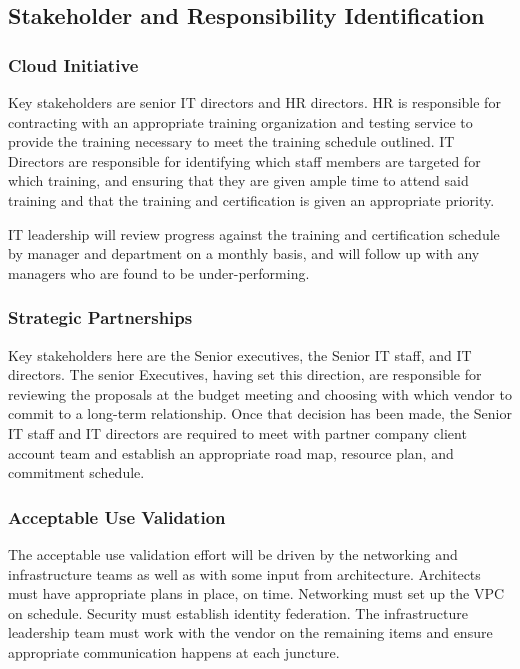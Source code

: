 \documentclass[stu]{apa7}
\begin{document}
\subsection{Stakeholder and Responsibility Identification}
\label{sec:orgabad5b5}

\subsubsection{Cloud Initiative}
\label{sec:org60ac614}

Key stakeholders are senior IT directors and HR directors. HR is responsible for contracting with an appropriate training organization and testing service to provide the training necessary to meet the training schedule outlined. IT Directors are responsible for identifying which staff members are targeted for which training, and ensuring that they are given ample time to attend said training and that the training and certification is given an appropriate priority.

IT leadership will review progress against the training and certification schedule by manager and department on a monthly basis, and will follow up with any managers who are found to be under-performing.

\subsubsection{Strategic Partnerships}
\label{sec:orgb2a6afc}

Key stakeholders here are the Senior executives, the Senior IT staff, and IT directors. The senior Executives, having set this direction, are responsible for reviewing the proposals at the budget meeting and choosing with which vendor to commit to a long-term relationship. Once that decision has been made, the Senior IT staff and IT directors are required to meet with partner company client account team and establish an appropriate road map, resource plan, and commitment schedule.

\subsubsection{Acceptable Use Validation}
\label{sec:org2926063}

The acceptable use validation effort will be driven by the networking and infrastructure teams as well as with some input from architecture. Architects must have appropriate plans in place, on time. Networking must set up the VPC on schedule. Security must establish identity federation. The infrastructure leadership team must work with the vendor on the remaining items and ensure appropriate communication happens at each juncture.
\end{document}

